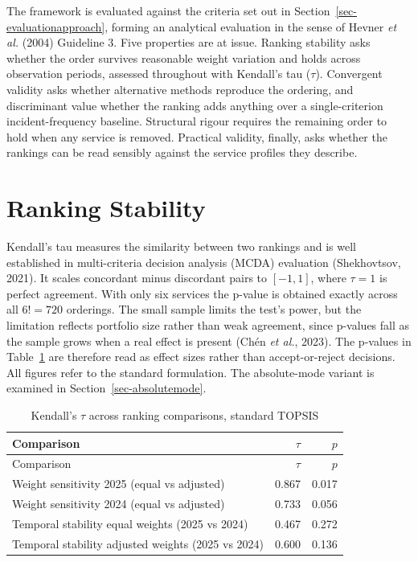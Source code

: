 \documentclass[
  12pt,
  letterpaper,
  12pt,
  oneside,
  english,
  onehalfspacing,
  headsepline]{MastersDoctoralThesis}
\begin{document}
The framework is evaluated against the criteria set out in
Section~\ref{sec-evaluationapproach}, forming an analytical evaluation
in the sense of Hevner \emph{et al.} (2004) Guideline 3. Five properties
are at issue. Ranking stability asks whether the order survives
reasonable weight variation and holds across observation periods,
assessed throughout with Kendall's tau (\(\tau\)). Convergent validity
asks whether alternative methods reproduce the ordering, and
discriminant value whether the ranking adds anything over a
single-criterion incident-frequency baseline. Structural rigour requires
the remaining order to hold when any service is removed. Practical
validity, finally, asks whether the rankings can be read sensibly
against the service profiles they describe.

\section{Ranking Stability}\label{sec-stability}

Kendall's tau measures the similarity between two rankings and is well
established in multi-criteria decision analysis (MCDA) evaluation
(Shekhovtsov, 2021). It scales concordant minus discordant pairs to
\([-1, 1]\), where \(\tau = 1\) is perfect agreement. With only six
services the p-value is obtained exactly across all \(6! = 720\)
orderings. The small sample limits the test's power, but the limitation
reflects portfolio size rather than weak agreement, since p-values fall
as the sample grows when a real effect is present (Chén \emph{et al.},
2023). The p-values in Table~\ref{tbl-kendall} are therefore read as
effect sizes rather than accept-or-reject decisions. All figures refer
to the standard formulation. The absolute-mode variant is examined in
Section~\ref{sec-absolutemode}.

\begin{samepage}
\footnotesize

\begin{longtable}[]{@{}lrr@{}}
\caption{Kendall's \(\tau\) across ranking comparisons, standard
TOPSIS}\label{tbl-kendall}\tabularnewline
\toprule\noalign{}
Comparison & \(\tau\) & \(p\) \\
\midrule\noalign{}
\endfirsthead
\toprule\noalign{}
Comparison & \(\tau\) & \(p\) \\
\midrule\noalign{}
\endhead
\bottomrule\noalign{}
\endlastfoot
Weight sensitivity 2025 (equal vs adjusted) & 0.867 & 0.017 \\
Weight sensitivity 2024 (equal vs adjusted) & 0.733 & 0.056 \\
Temporal stability equal weights (2025 vs 2024) & 0.467 & 0.272 \\
Temporal stability adjusted weights (2025 vs 2024) & 0.600 & 0.136 \\
\end{longtable}

\end{samepage}
\end{document}
